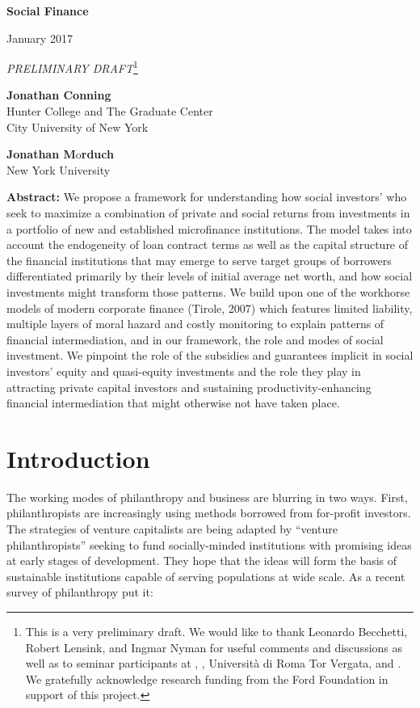 \documentclass[
]{article}
\date{}
\begin{document}
\textbf{Social Finance}

January 2017

\emph{PRELIMINARY DRAFT}\footnote{This is a very preliminary draft. We
  would like to thank Leonardo Becchetti, Robert Lensink, and Ingmar
  Nyman for useful comments and discussions as well as to seminar
  participants at , , Università di Roma Tor Vergata, and . We
  gratefully acknowledge research funding from the Ford Foundation in
  support of this project.}

\textbf{Jonathan Conning\\
}Hunter College and The Graduate Center\\
City University of New York

\textbf{Jonathan M}o\textbf{rduch\\
}New York University

\textbf{Abstract:} We propose a framework for understanding how social
investors' who seek to maximize a combination of private and social
returns from investments in a portfolio of new and established
microfinance institutions. The model takes into account the endogeneity
of loan contract terms as well as the capital structure of the financial
institutions that may emerge to serve target groups of borrowers
differentiated primarily by their levels of initial average net worth,
and how social investments might transform those patterns. We build upon
one of the workhorse models of modern corporate finance (Tirole, 2007)
which features limited liability, multiple layers of moral hazard and
costly monitoring to explain patterns of financial intermediation, and
in our framework, the role and modes of social investment. We pinpoint
the role of the subsidies and guarantees implicit in social investors'
equity and quasi-equity investments and the role they play in attracting
private capital investors and sustaining productivity-enhancing
financial intermediation that might otherwise not have taken place.

\hypertarget{introduction}{%
\section{Introduction}\label{introduction}}

The working modes of philanthropy and business are blurring in two ways.
First, philanthropists are increasingly using methods borrowed from
for-profit investors. The strategies of venture capitalists are being
adapted by ``venture philanthropists'' seeking to fund socially-minded
institutions with promising ideas at early stages of development. They
hope that the ideas will form the basis of sustainable institutions
capable of serving populations at wide scale. As a recent survey of
philanthropy put it:
\end{document}
